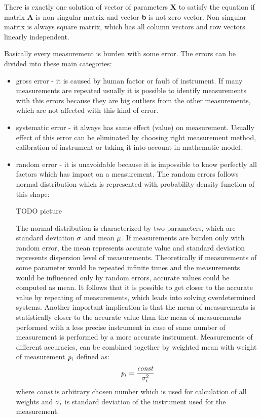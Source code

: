\documentclass[a4paper,12pt]{article}
\newcommand{\ematr}[1]{
{\bf #1}
}
\newcommand{\evect}[1]{
{\bf #1}
}
\newcommand{\escal}[1]{
{\it #1}
}
\begin{document}

There is exactly one solution 
of vector of parameters  \evect{X} to satisfy the equation if matrix \ematr{A} is 
non singular matrix  and vector \evect{b} is not zero vector. Non singular matrix is always square matrix, 
which has all column vectors and row vectors linearly independent. 


Basically every measurement is burden with some error. The errors can be divided into these main categories:  
\begin{itemize}
\item gross error - it is caused by human factor or fault of instrument. If many measurements are repeated
usually it is possible to identify measurements with this errors because they are big outliers from the other measurements, which are not affected with this 
kind of error.
\item systematic error - it always has same effect (value) on measurement.  Usually effect of this error can be 
eliminated by choosing right measurement method, calibration of instrument or taking it into account in  mathematic model.
\item random error - it is unavoidable because it is impossible to know perfectly all factors which has impact 
on a measurement. The random errors follows normal distribution which is represented with probability density function of this shape:


TODO picture


The normal distribution is characterized by two parameters, which are standard deviation 
$\escal{\sigma}$ and mean $\escal{\mu}$. 
If measurements are burden only with random error, the mean represents accurate value and standard deviation represents 
dispersion level of measurements. 
Theoretically  if measurements of some parameter would be repeated infinite times and the measurements would be influenced only by random errors,
accurate values could be computed as mean.
It follows that it is possible to get closer to the accurate value by repeating of measurements, which 
leads into solving overdetermined systems. Another important implication 
is that the mean of measurements is statistically closer to the accurate value than the mean of measurements performed
with a less precise instrument in case of same number of measurement is performed by a more accurate 
instrument.
Measurements of different accuracies, can be combined together by weighted mean
with weight of measurement $\escal{p}_{i}$ defined as:
\begin{equation}
\label{eq:wmean}
\escal{p}_{i} = \frac{\escal{const}}{\escal{\sigma}_{i}^{2}}
\end{equation} 
where \escal{const} is arbitrary chosen number which is used for calculation of all weights 
and $\escal{\sigma_{i}}$ is standard deviation of the instrument used for the measurement.
\end{itemize}
\end{document}

